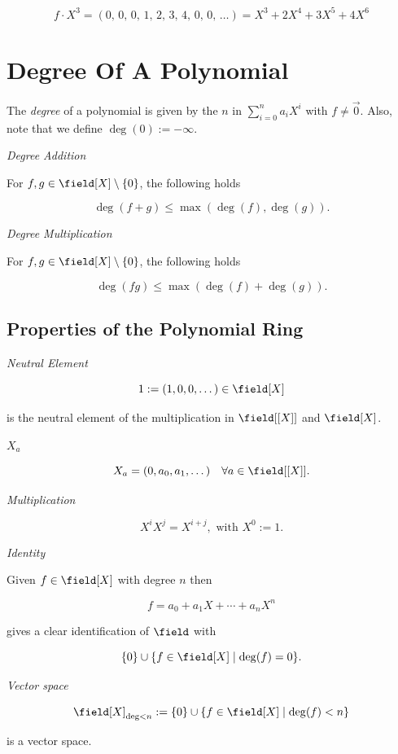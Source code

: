 \[
    f \cdot X^{3} = (0,\,0,\,0,\,1,\,2,\,3,\,4,\,0,\,0,\,\ldots) = X^{3} + 2X^{4} + 3X^{5} + 4X^{6}
\]

\section{Degree Of A Polynomial}

The \emph{degree} of a polynomial is given by the \(n\) in \(\sum_{i = 0}^{n} a_i X^i\) with \(f \ne \vec{0}\).
Also, note that we define \(\deg(0):= -\infty\).

\emph{Degree Addition}

For \(f,g \in \field[X] \setminus \{0\}\), the following holds 

\[
    \deg(f + g) \le \max(\deg(f),\deg(g)).
\]

\emph{Degree Multiplication}

For \(f,g \in \field[X] \setminus \{0\}\), the following holds 

\[
    \deg(fg) \le \max(\deg(f) + \deg(g)).
\]

\subsection{Properties of the Polynomial Ring}

\emph{Neutral Element}

\[
    1 := (1, 0, 0, \dots) \in \field[X]
\]

is the neutral element of the multiplication in \(\field[[X]]\) and \(\field[X]\).

\emph{\(X_a\)}

\[
    X_a = (0, a_0, a_1, \dots) \quad \forall a \in \field [[X]].
\]

\emph{Multiplication}

\[
    X^i X^j = X^{i + j}, \text{ with } X^0 := 1.
\]

\emph{Identity}

Given \(f \in \field[X]\) with degree \(n\) then 

\[
    f = a_0 + a_1 X + \cdots + a_n X^n
\]

gives a clear identification of \(\field\) with 

\[
    \{0\} \cup \{f \in \field [X] \mid \deg(f) = 0\}.
\]

\emph{Vector space}

\[
    \field[X]_{\deg < n} := \{0\} \cup \{f \in \field [X] \mid \deg(f) < n\}
\]

is a vector space.


